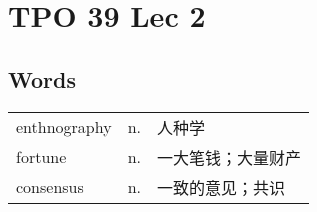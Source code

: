 \section{TPO 39 Lec 2}

\subsection{Words}

\begin{tabular}{lll}
    enthnography & n. & 人种学       \\
    fortune      & n. & 一大笔钱；大量财产 \\
    consensus    & n. & 一致的意见；共识  \\
\end{tabular}
